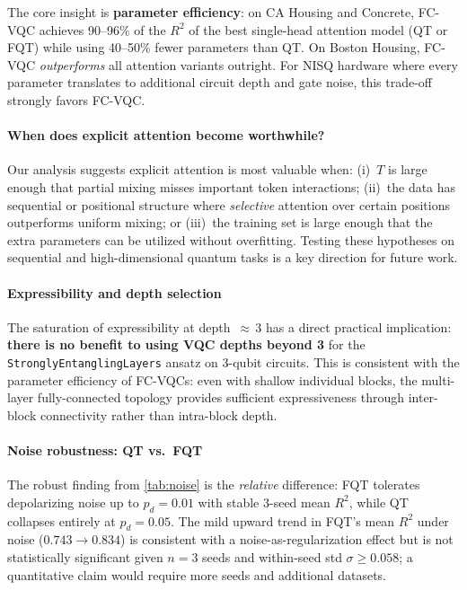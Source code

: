 \documentclass[10pt,conference]{IEEEtran}
\begin{document}
The core insight is \textbf{parameter efficiency}: on CA Housing and Concrete, FC-VQC achieves 90--96\% of the $R^2$ of the best single-head attention model (QT or FQT) while using 40--50\% fewer parameters than QT.
On Boston Housing, FC-VQC \emph{outperforms} all attention variants outright.
For NISQ hardware where every parameter translates to additional circuit depth and gate noise, this trade-off strongly favors FC-VQC.

\paragraph{When does explicit attention become worthwhile?}
Our analysis suggests explicit attention is most valuable when: (i)~$T$ is large enough that partial mixing misses important token interactions; (ii)~the data has sequential or positional structure where \emph{selective} attention over certain positions outperforms uniform mixing; or (iii)~the training set is large enough that the extra parameters can be utilized without overfitting.
Testing these hypotheses on sequential and high-dimensional quantum tasks is a key direction for future work.

\paragraph{Expressibility and depth selection}
The saturation of expressibility at depth~${\approx}\,3$ has a direct practical implication: \textbf{there is no benefit to using VQC depths beyond 3} for the \texttt{StronglyEntanglingLayers} ansatz on 3-qubit circuits.
This is consistent with the parameter efficiency of FC-VQCs: even with shallow individual blocks, the multi-layer fully-connected topology provides sufficient expressiveness through inter-block connectivity rather than intra-block depth.

\paragraph{Noise robustness: QT vs.\ FQT}
The robust finding from \cref{tab:noise} is the \emph{relative} difference: FQT tolerates depolarizing noise up to $p_d{=}0.01$ with stable 3-seed mean $R^2$, while QT collapses entirely at $p_d{=}0.05$.
The mild upward trend in FQT's mean $R^2$ under noise ($0.743 \!\to\! 0.834$) is consistent with a noise-as-regularization effect but is not statistically significant given $n{=}3$ seeds and within-seed std $\sigma{\geq}0.058$; a quantitative claim would require more seeds and additional datasets.
\end{document}
